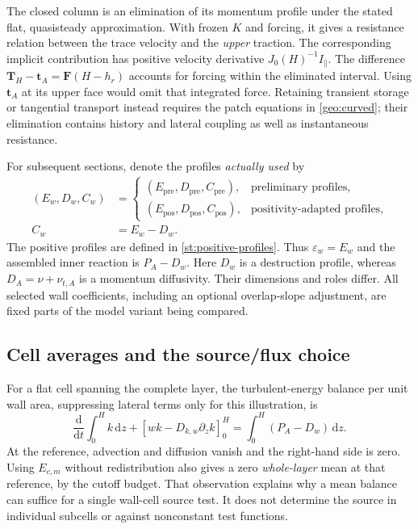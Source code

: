 \documentclass[11pt,a4paper]{article}
\numberwithin{equation}{section}
\newcommand{\eps}{\varepsilon}
\newcommand{\dd}{\mathrm d}
\begin{document}
The closed column is an elimination of its momentum profile under the
stated flat, quasisteady approximation.  With frozen $K$ and forcing,
it gives a resistance relation between the trace velocity and the
\emph{upper} traction.  The corresponding implicit contribution has
positive velocity derivative $J_0(H)^{-1}I_\parallel$.  The difference
$\boldsymbol T_H-\boldsymbol t_A=\boldsymbol F(H-h_r)$ accounts for
forcing within the eliminated interval.  Using $\boldsymbol t_A$ at
its upper face would omit that integrated force.  Retaining transient
storage or tangential transport instead requires the patch equations
in \cref{geo:curved}; their elimination contains history and lateral
coupling as well as instantaneous resistance.

For subsequent sections, denote the profiles \emph{actually used} by
\begin{equation}
 \begin{aligned}
 (E_w,D_w,C_w)&=
 \begin{cases}
 (E_{\mathrm{pre}},D_{\mathrm{pre}},C_{\mathrm{pre}}),
       &\text{preliminary profiles},\\
 (E_{\mathrm{pos}},D_{\mathrm{pos}},C_{\mathrm{pos}}),
       &\text{positivity-adapted profiles},
 \end{cases}\\
 C_w&=E_w-D_w .
 \end{aligned}
 \label{geo:used-profiles}
\end{equation}
The positive profiles are defined in \cref{st:positive-profiles}.
Thus $\eps_w=E_w$ and the assembled inner reaction is $P_A-D_w$.
Here $D_w$ is a destruction profile, whereas $D_A=\nu+\nu_{t,A}$
is a momentum diffusivity.  Their dimensions and roles differ.
All selected wall coefficients, including an optional overlap-slope
adjustment, are fixed parts of the model variant being compared.

\subsection{Cell averages and the source/flux choice}

For a flat cell spanning the complete layer, the turbulent-energy
balance per unit wall area, suppressing lateral terms only for this
illustration, is
\begin{equation}
 \frac{\dd}{\dd t}\int_0^H k\,\dd z
 +[wk-D_{k,w}\partial_z k]_0^H
 =\int_0^H(P_A-D_w)\,\dd z.
 \label{geo:fv-balance}
\end{equation}
At the reference, advection and diffusion vanish and the right-hand
side is zero.  Using $E_{c,m}$ without redistribution also gives a
zero \emph{whole-layer} mean at that reference, by the cutoff budget.
That observation explains why a mean balance can suffice for a
single wall-cell source test.  It does not determine the source in
individual subcells or against nonconstant test functions.
\end{document}
